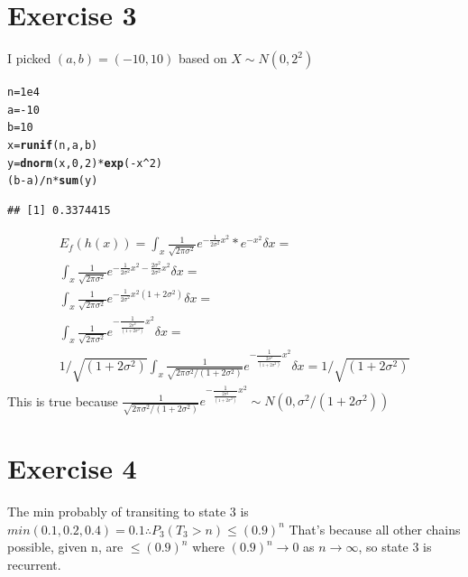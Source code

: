 \documentclass{article}\usepackage[]{graphicx}\usepackage[]{color}
\makeatletter
\newcommand{\hlnum}[1]{\textcolor[rgb]{0.686,0.059,0.569}{#1}}%
\newcommand{\hlopt}[1]{\textcolor[rgb]{0,0,0}{#1}}%
\newcommand{\hlstd}[1]{\textcolor[rgb]{0.345,0.345,0.345}{#1}}%
\newcommand{\hlkwb}[1]{\textcolor[rgb]{0.69,0.353,0.396}{#1}}%
\newcommand{\hlkwd}[1]{\textcolor[rgb]{0.737,0.353,0.396}{\textbf{#1}}}%
\newenvironment{kframe}{%
 \def\at@end@of@kframe{}%
 \ifinner\ifhmode%
  \def\at@end@of@kframe{\end{minipage}}%
  \begin{minipage}{\columnwidth}%
 \fi\fi%
 \def\FrameCommand##1{\hskip\@totalleftmargin \hskip-\fboxsep
 \colorbox{shadecolor}{##1}\hskip-\fboxsep
     \hskip-\linewidth \hskip-\@totalleftmargin \hskip\columnwidth}%
 \MakeFramed {\advance\hsize-\width
   \@totalleftmargin\z@ \linewidth\hsize
   \@setminipage}}%
 {\par\unskip\endMakeFramed%
 \at@end@of@kframe}
\newenvironment{knitrout}{}{} %
\makeatother
\begin{document}
\section*{Exercise 3}
I picked $(a,b) = (-10,10)$ based on $X\sim N(0,2^2)$
\begin{knitrout}
\color{fgcolor}\begin{kframe}
\begin{alltt}
\hlstd{n} \hlkwb{=} \hlnum{1e4}
\hlstd{a} \hlkwb{=} \hlopt{-}\hlnum{10}
\hlstd{b} \hlkwb{=} \hlnum{10}
\hlstd{x} \hlkwb{=} \hlkwd{runif}\hlstd{(n, a, b)}
\hlstd{y} \hlkwb{=} \hlkwd{dnorm}\hlstd{(x,}\hlnum{0}\hlstd{,}\hlnum{2}\hlstd{)}\hlopt{*}\hlkwd{exp}\hlstd{(}\hlopt{-}\hlstd{x}\hlopt{^}\hlnum{2}\hlstd{)}
\hlstd{(b}\hlopt{-}\hlstd{a)}\hlopt{/}\hlstd{n}\hlopt{*}\hlkwd{sum}\hlstd{(y)}
\end{alltt}
\begin{verbatim}
## [1] 0.3374415
\end{verbatim}
\end{kframe}
\end{knitrout}
\begin{equation}
\begin{split}
E_{f}(h(x)) = \int_{x}\frac{1}{\sqrt{2\pi\sigma^{2}}}e^{-\frac{1}{2\sigma^2}x^2}*e^{-x^2} \delta x = \\
\int_{x}\frac{1}{\sqrt{2\pi\sigma^{2}}}e^{-\frac{1}{2\sigma^2}x^2 -\frac{2\sigma^2}{2\sigma^2}x^2} \delta x = \\
\int_{x}\frac{1}{\sqrt{2\pi\sigma^{2}}}e^{-\frac{1}{2\sigma^2}x^2(1+2\sigma^2)} \delta x = \\
\int_{x}\frac{1}{\sqrt{2\pi\sigma^{2}}}e^{-\frac{1}{\frac{2\sigma^2}{(1+2\sigma^2)}}x^2} \delta x = \\
1/\sqrt{(1+2\sigma^2)}\int_{x}\frac{1}{\sqrt{2\pi\sigma^{2}/(1+2\sigma^2)}}e^{-\frac{1}{\frac{2\sigma^2}{(1+2\sigma^2)}}x^2} \delta x =
1/\sqrt{(1+2\sigma^2)}
\end{split}
\end{equation}
This is true because $\frac{1}{\sqrt{2\pi\sigma^{2}/(1+2\sigma^2)}}e^{-\frac{1}{\frac{2\sigma^2}{(1+2\sigma^2)}}x^2}\sim N(0, \sigma^2/(1+2\sigma^2))$

\section*{Exercise 4}
The min probably of transiting to state 3 is $min(0.1, 0.2,0.4)=0.1\therefore P_{3}(T_{3}>n)\leq (0.9)^{n}$ That's because all other chains possible, given n, are $\leq (0.9)^{n}$ where
$(0.9)^{n} \rightarrow 0$ as $n \rightarrow \infty$, so state 3 is recurrent.
\end{document}
